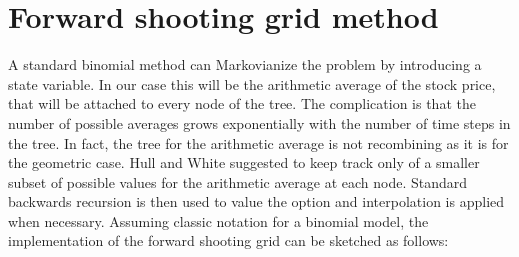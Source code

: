 \documentclass[12pt]{article}
\numberwithin{equation}{section}
\begin{document}
\section{Forward shooting grid method}
A standard binomial method can Markovianize the problem by introducing a state variable. In our case this will be the arithmetic average of the stock price, that will be attached to every node of the tree. The complication is that the number of possible averages grows exponentially with the number of time steps in the tree. In fact, the tree for the arithmetic average is not recombining as it is for the geometric case. Hull and White \cite{HullWhite} suggested to keep track only of a smaller subset of possible values for the arithmetic average at each node. Standard backwards recursion is then used to value the option and interpolation is applied when necessary. Assuming classic notation for a binomial model, the implementation of the forward shooting grid can be sketched as follows:
\end{document}
